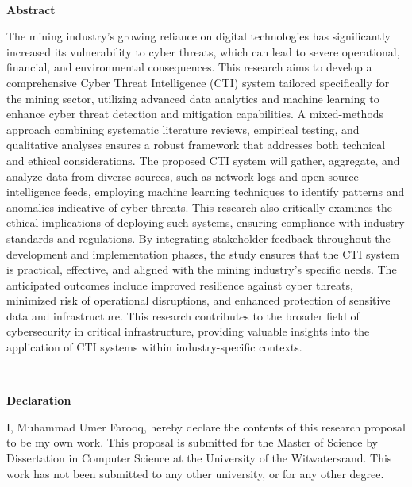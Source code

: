 \documentclass[a4paper,twoside,12pt]{report}
\renewenvironment{abstract}{\ \vfill\begin{center}\textbf{Abstract}\end{center}\addcontentsline{toc}{section}{Abstract}}{\vfill\vfill\newpage}
\newenvironment{declaration}{\ \vfill\begin{center}\textbf{Declaration}\end{center}\addcontentsline{toc}{section}{Declaration}}{\vfill\vfill\newpage}
\begin{document}
\begin{abstract}
The mining industry's growing reliance on digital technologies has significantly increased its vulnerability to cyber threats, which can lead to severe operational, financial, and environmental consequences. This research aims to develop a comprehensive Cyber Threat Intelligence (CTI) system tailored specifically for the mining sector, utilizing advanced data analytics and machine learning to enhance cyber threat detection and mitigation capabilities. A mixed-methods approach combining systematic literature reviews, empirical testing, and qualitative analyses ensures a robust framework that addresses both technical and ethical considerations. The proposed CTI system will gather, aggregate, and analyze data from diverse sources, such as network logs and open-source intelligence feeds, employing machine learning techniques to identify patterns and anomalies indicative of cyber threats. This research also critically examines the ethical implications of deploying such systems, ensuring compliance with industry standards and regulations. By integrating stakeholder feedback throughout the development and implementation phases, the study ensures that the CTI system is practical, effective, and aligned with the mining industry’s specific needs. The anticipated outcomes include improved resilience against cyber threats, minimized risk of operational disruptions, and enhanced protection of sensitive data and infrastructure. This research contributes to the broader field of cybersecurity in critical infrastructure, providing valuable insights into the application of CTI systems within industry-specific contexts.
\end{abstract}

\begin{declaration}
I, Muhammad Umer Farooq, hereby declare the contents of this research proposal to be my own work.
This proposal is submitted for the Master of Science by Dissertation in Computer Science at the University of the Witwatersrand.
This work has not been submitted to any other university, or for any other degree.
\end{declaration}
\end{document}
